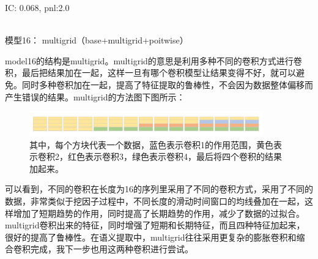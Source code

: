 \documentclass[11pt]{ctexart}
\begin{document}
{\kaishu \small IC: 0.068, pnl:2.0}

~\\
模型16： multigrid（base+multigrid+poitwise）

model16的结构是multigrid。multigrid的意思是利用多种不同的卷积方式进行卷积，最后把结果加在一起，这样一旦有哪个卷积模型让结果变得不好，就可以避免。同时多种卷积加在一起，提高了特征提取的鲁棒性，不会因为数据整体偏移而产生错误的结果。multigrid的方法图下图所示：
\begin{figure}[H]
\begin{center}
\includegraphics[width=0.9\textwidth]{str9.PNG}
\end{center}
\caption{其中，每个方块代表一个数据，蓝色表示卷积1的作用范围，黄色表示卷积2，红色表示卷积3，绿色表示卷积4，最后将四个卷积的结果加起来。}
\label{FIG.9}
\end{figure}
可以看到，不同的卷积在长度为16的序列里采用了不同的卷积方式，采用了不同的数据，非常类似于挖因子过程中，不同长度的滑动时间窗口的均线叠加在一起，这样增加了短期趋势的作用，同时提高了长期趋势的作用，减少了数据的过拟合。multigrid卷积出来的特征，同时增强了短期和长期特征，而且四种特征加起来，很好的提高了鲁棒性。在语义提取中，multigrid往往采用更复杂的膨胀卷积和缩合卷积完成，我下一步也用这两种卷积进行尝试。
\end{document}

